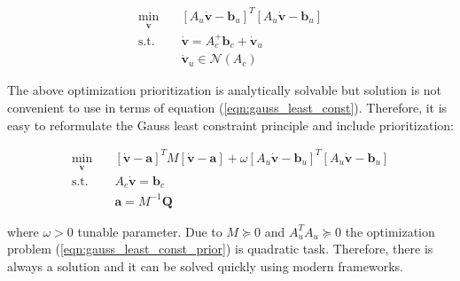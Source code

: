 \begin{equation}
    \begin{aligned}
        \min_{\dot{\mathbf{v}}} \quad & 
        [A_u \dot{\mathbf{v}} - \mathbf{b}_u]^T 
        [A_u \dot{\mathbf{v}} - \mathbf{b}_u]\\
        \textrm{s.t.} \quad & \dot{\mathbf{v}} = A_c^{+} \mathbf{b}_c + 
        \dot{\mathbf{v}}_u \\ 
        \quad & \dot{\mathbf{v}}_u \in \mathcal{N}(A_c)
    \end{aligned}
    \label{eqn:task_prior_null_space}
\end{equation}

The above optimization prioritization is analytically solvable but solution 
is not convenient to use in terms of equation (\ref{eqn:gauss_least_const}). 
Therefore, it is easy to reformulate the Gauss least constraint principle and 
include prioritization:

\begin{equation}
    \begin{aligned}
        \min_{\dot{\mathbf{v}}} \quad &
        [\dot{\mathbf{v}} - \mathbf{a}]^T M [\dot{\mathbf{v}} - \mathbf{a}] +
        \omega 
        [A_u \dot{\mathbf{v}} - \mathbf{b}_u]^T 
        [A_u \dot{\mathbf{v}} - \mathbf{b}_u]\\
        \textrm{s.t.} \quad &
        A_c \dot{\mathbf{v}} = \mathbf{b}_c \\
        &
        \mathbf{a} = M^{-1} \mathbf{Q}
    \end{aligned}
    \label{eqn:gauss_least_const_prior}
\end{equation}

where $\omega > 0$ tunable parameter. Due to $M \succcurlyeq 0 $ and 
$A_u^T A_u \succcurlyeq 0$ the optimization problem 
(\ref{eqn:gauss_least_const_prior}) is quadratic task. Therefore, there is 
always a solution and it can be solved quickly using modern frameworks.
